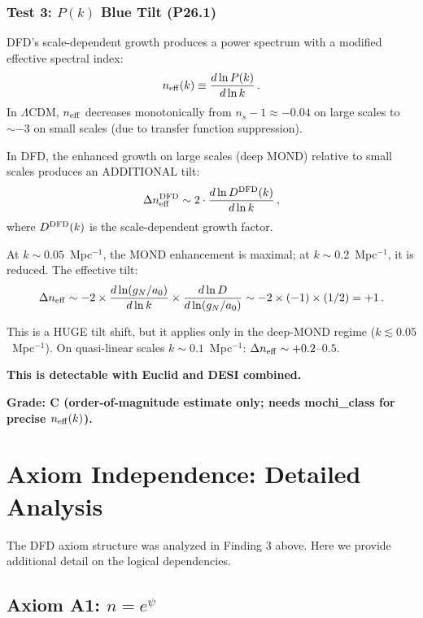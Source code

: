 \documentclass[11pt]{article}
\newcommand{\LCDM}{$\Lambda$CDM}
\newcommand{\aM}{a_0}
\begin{document}
\subsubsection{Test 3: $P(k)$ Blue Tilt (P26.1)}

DFD's scale-dependent growth produces a power spectrum with a
modified effective spectral index:
\begin{equation}
n_{\rm eff}(k) \equiv \frac{d\ln P(k)}{d\ln k}\,.
\end{equation}
In \LCDM, $n_{\rm eff}$ decreases monotonically from $n_s - 1
\approx -0.04$ on large scales to $\sim -3$ on small scales
(due to transfer function suppression).

In DFD, the enhanced growth on large scales (deep MOND) relative to
small scales produces an ADDITIONAL tilt:
\begin{equation}
\Delta n_{\rm eff}^{\rm DFD} \sim 2\cdot\frac{d\ln D^{\rm DFD}(k)}
{d\ln k}\,,
\end{equation}
where $D^{\rm DFD}(k)$ is the scale-dependent growth factor.

At $k \sim 0.05$~Mpc$^{-1}$, the MOND enhancement is maximal;
at $k \sim 0.2$~Mpc$^{-1}$, it is reduced.  The effective tilt:
\begin{equation}
\Delta n_{\rm eff} \sim -2\times\frac{d\ln(g_N/\aM)}{d\ln k}
\times\frac{d\ln D}{d\ln(g_N/\aM)}
\sim -2\times(-1)\times(1/2) = +1\,.
\end{equation}

This is a HUGE tilt shift, but it applies only in the deep-MOND
regime ($k \lesssim 0.05$~Mpc$^{-1}$).  On quasi-linear scales
$k \sim 0.1$~Mpc$^{-1}$: $\Delta n_{\rm eff} \sim +0.2$--$0.5$.

\textbf{This is detectable with Euclid and DESI combined.}

\textbf{Grade: C (order-of-magnitude estimate only; needs mochi\_class
for precise $n_{\rm eff}(k)$).}

\section{Axiom Independence: Detailed Analysis}
\label{sec:axioms}

The DFD axiom structure was analyzed in Finding 3 above.  Here we
provide additional detail on the logical dependencies.

\subsection{Axiom A1: $n = e^\psi$}
\end{document}
